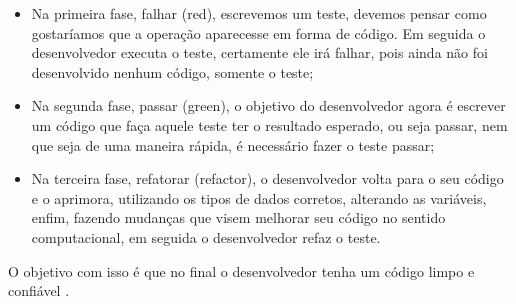 \documentclass[pnumabnt,normaltoc,espacoumemeio,capchap]{abnt}
\begin{document}
\begin{itemize}
	\item Na primeira fase, falhar (red), escrevemos um teste, devemos pensar como gostaríamos que a operação aparecesse em forma de código. Em seguida o desenvolvedor executa o teste, certamente ele irá falhar, pois ainda não foi desenvolvido nenhum código, somente o teste;
	\item Na segunda fase, passar (green), o objetivo do desenvolvedor agora é escrever um código que faça aquele teste ter o resultado esperado, ou seja passar, nem que seja de uma maneira rápida, é necessário fazer o teste passar;
	\item Na terceira fase, refatorar (refactor), o desenvolvedor volta para o seu código e o aprimora, utilizando os tipos de dados corretos, alterando as variáveis, enfim, fazendo mudanças que visem melhorar seu código no sentido computacional, em seguida o desenvolvedor refaz o teste.
\end{itemize}
\par O objetivo com isso é que no final o desenvolvedor tenha um código limpo e confiável \cite{KB2003}.
\end{document}
